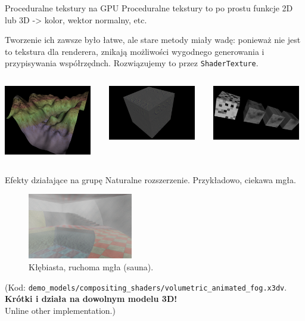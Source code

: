 \documentclass{beamer}
\begin{document}
\begin{frame}{Proceduralne tekstury na GPU}
Proceduralne tekstury to po prostu funkcje 2D lub 3D ->
kolor, wektor normalny, etc.

Tworzenie ich zawsze było łatwe, ale stare metody miały wadę:
ponieważ nie jest to tekstura dla renderera, znikają możliwości wygodnego
generowania i przypisywania współrzędnch. Rozwiązujemy to przez
\texttt{ShaderTexture}.

\begin{columns}[T]
  \begin{column}{1in}
    \includegraphics[width=1.5in]{../terrain}
  \end{column}
  \begin{column}{1in}
    \includegraphics[width=1.5in]{../shader_texture_edge_detection}
  \end{column}
  \begin{column}{1in}
    \includegraphics[width=1.5in]{../noise}
  \end{column}
\end{columns}

\end{frame}

\begin{frame}{Efekty działające na grupę}
Naturalne rozszerzenie. Przykładowo, ciekawa mgła.

\begin{figure}
  \centering
  \includegraphics[width=1.8in]{../volumetric_animated_fog_all}
  \caption{Kłębiasta, ruchoma mgła (sauna).}
\end{figure}

(Kod: \texttt{demo\_models/compositing\_shaders/volumetric\_animated\_fog.x3dv}.\\
\textbf{Krótki i działa na dowolnym modelu 3D!}\\
Unline other implementation.)

\end{frame}
\end{document}
